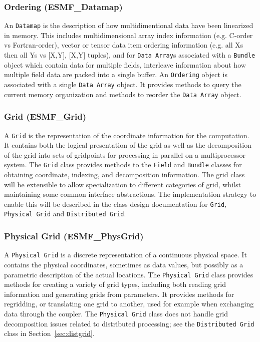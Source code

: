 \subsubsection{Ordering (ESMF\_Datamap)}
\label{sec:ordering} 
An {\tt Datamap} is the description of how multidimentional data have been
linearized in memory.  This includes multidimensional array index information (e.g. C-order
vs Fortran-order), vector or tensor data item ordering information (e.g. all Xs then all
Ys vs [X,Y], [X,Y] tuples), and for {\tt Data Array}s associated with a {\tt Bundle} object which contain
data for multiple fields, interleave information about how multiple field data are 
packed into a single buffer.
An {\tt Ordering} object is associated with a single {\tt Data Array} object.  It provides
methods to query the current memory organization and methods to reorder the 
{\tt Data Array} object.

\subsubsection{Grid (ESMF\_Grid)}
\label{sec:grid} 
A {\tt Grid} is the representation of the coordinate information for
the computation.  It contains both the logical presentation of the grid 
as well as the
decomposition of the grid into sets of gridpoints for processing in parallel on a
multiprocessor system.  The {\tt Grid} class provides methods to the
{\tt Field} and {\tt Bundle} classes for obtaining coordinate, indexing, and 
decomposition information. The grid class will be extensible 
to allow specialization to different categories of grid, whilst maintaining
some common interface abstractions. The implementation strategy to enable this
will be described in the class design documentation for {\tt Grid}, {\tt Physical Grid} and {\tt Distributed Grid}.

\subsubsection{Physical Grid (ESMF\_PhysGrid)}
\label{sec:physgrid} 
A {\tt Physical Grid} is a discrete representation of a continuous physical space.  It contains the physical coordinates, sometimes as data values, but possibly
as a parametric description of the actual locations.  
The {\tt Physical Grid} class provides methods for creating a variety of grid 
types, including both reading grid information
and generating grids from parameters.  It provides methods for regridding, or translating
one grid to another, used for example when exchanging data through the coupler.
The {\tt Physical Grid} class does not handle grid decomposition issues related to 
distributed processing; see the {\tt Distributed Grid} class in 
Section~\ref{sec:distgrid}.

